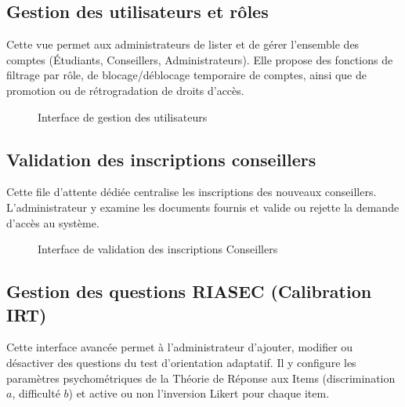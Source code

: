 \subsection{Gestion des utilisateurs et rôles}

Cette vue permet aux administrateurs de lister et de gérer l'ensemble des comptes (Étudiants, Conseillers, Administrateurs). Elle propose des fonctions de filtrage par rôle, de blocage/déblocage temporaire de comptes, ainsi que de promotion ou de rétrogradation de droits d'accès.

\begin{figure}[H]
    \centering
    \caption{Interface de gestion des utilisateurs}
    \label{fig:interface_users_management}
\end{figure}

\subsection{Validation des inscriptions conseillers}

Cette file d'attente dédiée centralise les inscriptions des nouveaux conseillers. L'administrateur y examine les documents fournis et valide ou rejette la demande d'accès au système.

\begin{figure}[H]
    \centering
    \caption{Interface de validation des inscriptions Conseillers}
    \label{fig:interface_counselors_approvals}
\end{figure}

\subsection{Gestion des questions RIASEC (Calibration IRT)}

Cette interface avancée permet à l'administrateur d'ajouter, modifier ou désactiver des questions du test d'orientation adaptatif. Il y configure les paramètres psychométriques de la Théorie de Réponse aux Items (discrimination $a$, difficulté $b$) et active ou non l'inversion Likert pour chaque item.

